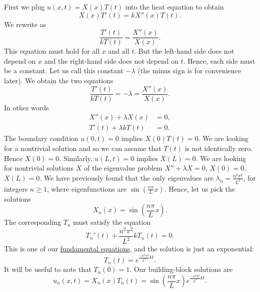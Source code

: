 First we plug $u(x,t) = X(x)T(t)$ into the heat equation to
obtain
\begin{equation*}
X(x)T'(t) = k X''(x)T(t) .
\end{equation*}
We rewrite as
\begin{equation*}
\frac{T'(t)}{k T(t)} =
\frac{X''(x)}{X(x)} .
\end{equation*}
This equation must hold for all $x$ and all $t$.  But the
left-hand side does not depend on $x$ and the right-hand side does not
depend on $t$.  Hence, each side must be a constant.  Let us call this
constant $-\lambda$ (the minus sign is for convenience later).
We obtain the two equations
\begin{equation*}
\frac{T'(t)}{k T(t)} = -\lambda =
\frac{X''(x)}{X(x)} .
\end{equation*}
In other words
\begin{align*}
X''(x) + \lambda X(x) &= 0 , \\
T'(t) + \lambda k T(t) &= 0 .
\end{align*}
The boundary condition $u(0,t) = 0$ implies $X(0)T(t) = 0$.  We are looking
for a nontrivial solution and so we can assume that $T(t)$ is not identically
zero.  Hence $X(0) = 0$.  Similarly, $u(L,t) = 0$ implies $X(L) = 0$.  We
are looking for nontrivial solutions $X$ of the eigenvalue problem
$X'' + \lambda X = 0$, $X(0) = 0$, $X(L) = 0$.  We have previously found that
the only eigenvalues are $\lambda_n = \frac{n^2 \pi^2}{L^2}$, for integers
$n \geq 1$,
where eigenfunctions are $\sin \left(\frac{n \pi}{L} x\right)$.  Hence, let us pick
the solutions
\begin{equation*}
X_n (x) = \sin \left(\frac{n \pi}{L} x \right) .
\end{equation*}
The corresponding $T_n$ must satisfy the equation
\begin{equation*}
T_n'(t) + \frac{n^2 \pi^2}{L^2} k T_n(t) = 0 .
\end{equation*}
This is one of our
\hyperref[subsection:fourfundamental]{fundamental equations},
and the solution is just
an exponential:
\begin{equation*}
T_n(t) = e^{\frac{-n^2 \pi^2}{L^2} k t} .
\end{equation*}
It will be useful to note that $T_n(0) = 1$.
Our building-block solutions are
\begin{equation*}
u_n(x,t) = X_n(x)T_n(t) =
\sin \left( \frac{n \pi}{L} x \right)
e^{\frac{-n^2 \pi^2}{L^2} k t} .
\end{equation*}

